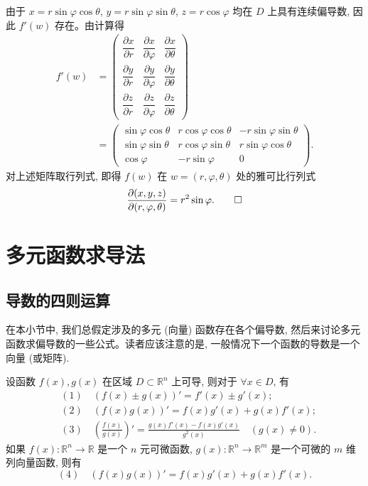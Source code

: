 \begin{solve}
由于 $x=r\sin\varphi\cos\theta$, $y=r\sin\varphi\sin\theta$, $z=r\cos\varphi$ 均在 $D$ 上具有连续偏导数, 因此 $f'(w)$ 存在。由计算得
\[
\begin{aligned}
  f'(w)
  &=
  \begin{pmatrix}
    \dfrac{\partial x}{\partial r}&\dfrac{\partial x}{\partial\varphi}&\dfrac{\partial x}{\partial\theta}\\
    \dfrac{\partial y}{\partial r}&\dfrac{\partial y}{\partial\varphi}&\dfrac{\partial y}{\partial\theta}\\
    \dfrac{\partial z}{\partial r}&\dfrac{\partial z}{\partial\varphi}&\dfrac{\partial z}{\partial\theta}
  \end{pmatrix}\\
  &=
  \begin{pmatrix}
    \sin\varphi\cos\theta&r\cos\varphi\cos\theta&-r\sin\varphi\sin\theta\\
    \sin\varphi\sin\theta&r\cos\varphi\sin\theta&r\sin\varphi\cos\theta\\
    \cos\varphi&-r\sin\varphi&0
  \end{pmatrix}.
\end{aligned}
\]
对上述矩阵取行列式, 即得 $f(w)$ 在 $w=(r,\varphi,\theta)$ 处的雅可比行列式
\[
  \frac{\partial(x,y,z)}{\partial(r,\varphi,\theta)}=r^2\sin\varphi.
\qedhere
\]
\end{solve}


\section{多元函数求导法}
\label{sec:ma-14-2}

\subsection{导数的四则运算}
\label{subsec:ma-14-2-1}

在本小节中, 我们总假定涉及的多元 (向量) 函数存在各个偏导数, 然后来讨论多元函数求偏导数的一些公式。读者应该注意的是, 一般情况下一个函数的导数是一个向量 (或矩阵).

\begin{theorem}\label{theorem:ma-14-2-1}
设函数 $f(x),g(x)$ 在区域 $D\subset\mathbb R^n$ 上可导, 则对于 $\forall x\in D$, 有
\[
\begin{aligned}
  &(1)\quad (f(x)\pm g(x))'=f'(x)\pm g'(x);\\
  &(2)\quad (f(x)g(x))'=f(x)g'(x)+g(x)f'(x);\\
  &(3)\quad \left(\frac{f(x)}{g(x)}\right)'=
  \frac{g(x)f'(x)-f(x)g'(x)}{g^2(x)}\quad (g(x)\ne0).
\end{aligned}
\]
如果 $f(x):\mathbb R^n\to\mathbb R$ 是一个 $n$ 元可微函数, $g(x):\mathbb R^n\to\mathbb R^m$ 是一个可微的 $m$ 维列向量函数, 则有
\[
  (4)\quad (f(x)g(x))'=f(x)g'(x)+g(x)f'(x).
\]
\end{theorem}


